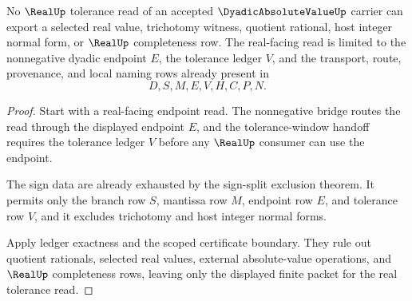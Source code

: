 \begin{theorem}
\label{thm:dyadic-absolute-value-real-tolerance-non-escape}
No $\RealUp$ tolerance read of an accepted $\DyadicAbsoluteValueUp$ carrier can export a selected real value, trichotomy witness, quotient rational, host integer normal form, or $\RealUp$ completeness row. The real-facing read is limited to the nonnegative dyadic endpoint $E$, the tolerance ledger $V$, and the transport, route, provenance, and local naming rows already present in
$$
D,S,M,E,V,H,C,P,N.
$$
\end{theorem}
\begin{proof}
Start with a real-facing endpoint read. The nonnegative bridge routes the read through the displayed endpoint $E$, and the tolerance-window handoff requires the tolerance ledger $V$ before any $\RealUp$ consumer can use the endpoint.

The sign data are already exhausted by the sign-split exclusion theorem. It permits only the branch row $S$, mantissa row $M$, endpoint row $E$, and tolerance row $V$, and it excludes trichotomy and host integer normal forms.

Apply ledger exactness and the scoped certificate boundary. They rule out quotient rationals, selected real values, external absolute-value operations, and $\RealUp$ completeness rows, leaving only the displayed finite packet for the real tolerance read.
\end{proof}

